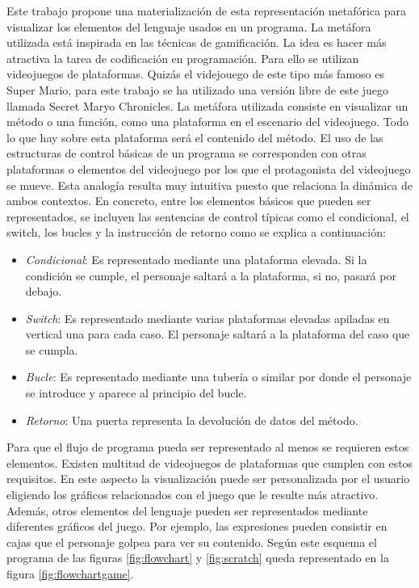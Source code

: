 \documentclass{llncs}
\begin{document}
Este trabajo propone una materialización de esta representación metafórica para visualizar los elementos del lenguaje usados en un programa. La metáfora utilizada está inspirada en las técnicas de gamificación. La idea es hacer más atractiva la tarea de codificación en programación. Para ello se utilizan videojuegos de plataformas. Quizás el videjouego de este tipo más famoso es Super Mario, para este trabajo se ha utilizado una versión libre de este juego llamada Secret Maryo Chronicles. La metáfora utilizada consiste en visualizar un método o una función, como una plataforma en el escenario del videojuego. Todo lo que hay sobre esta plataforma será el contenido del método. El uso de las estructuras de control básicas de un programa se corresponden con otras plataformas o elementos del videojuego por los que el protagonista del videojuego se mueve. Esta analogía resulta muy intuitiva puesto que relaciona la dinámica de ambos contextos. En concreto, entre los elementos básicos que pueden ser representados, se incluyen las sentencias de control típicas como el condicional, el switch, los bucles y la instrucción de retorno como se explica a continuación: 

\begin{itemize}
\item {\em Condicional}: Es representado mediante una plataforma elevada. Si la condición se cumple, el personaje saltará a la plataforma, si no, pasará por debajo.
\item {\em Switch}: Es representado mediante varias plataformas elevadas apiladas en vertical una para cada caso. El personaje saltará a la plataforma del caso que se cumpla.
\item {\em Bucle}: Es representado mediante una tubería o similar por donde el personaje se introduce y aparece al principio del bucle.
\item {\em Retorno}: Una puerta representa la devolución de datos del método.
\end{itemize}

Para que el flujo de programa pueda ser representado al menos se requieren estos elementos. Existen multitud de videojuegos de plataformas que cumplen con estos requisitos. En este aspecto la visualización puede ser personalizada por el usuario eligiendo los gráficos relacionados con el juego que le resulte más atractivo. Además, otros elementos del lenguaje pueden ser representados mediante diferentes gráficos del juego. Por ejemplo, las expresiones pueden consistir en cajas que el personaje golpea para ver su contenido. Según este esquema el programa de las figuras \ref{fig:flowchart} y \ref{fig:scratch} queda representado en la figura \ref{fig:flowchartgame}.
\end{document}

